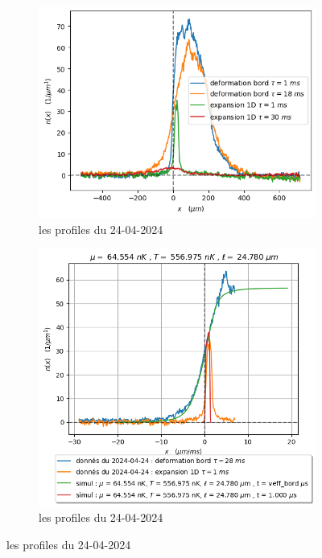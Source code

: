 \documentclass[a3, 10pt,twoside]{article}          %
\theoremstyle{plain}
\theoremstyle{definition}
\theoremstyle{remark}
\theoremstyle{definition} %
\begin{document}
\begin{enumerate}[label =\Alph*)]
\begin{enumerate}[label =\alph*)]
					\end{enumerate}
			\end{enumerate}


			


	
	
	
	
	\begin{figure}[ht]
    \centering
    \begin{subfigure}[b]{0.45\textwidth}
        \centering
        \includegraphics[width=\textwidth]{Figures/donnees_24-04-2024}
        \caption{les profiles du 24-04-2024}
        \label{fig:sub1}
    \end{subfigure}
    \hfill
     \begin{subfigure}[b]{0.45\textwidth}
        \centering
        \includegraphics[width=\textwidth]{Figures/simul_deformation_18_24-04-2024}
        \caption{les profiles du 24-04-2024}
        \label{fig:sub1}
    \end{subfigure}
    

\end{figure}
\end{document}
